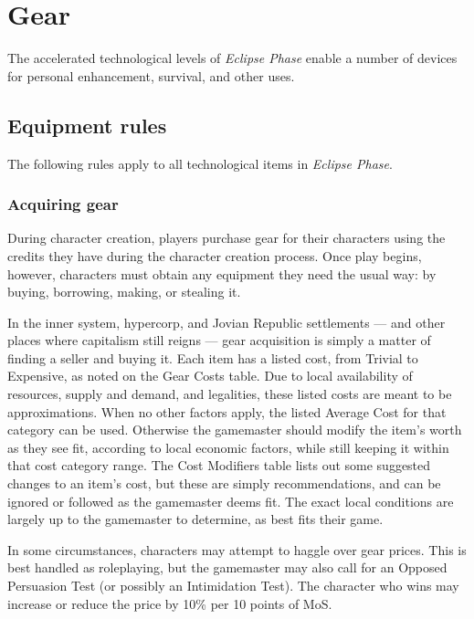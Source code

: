 



\chapter{Gear} \label{cha:gear} 

The accelerated technological levels of \emph{Eclipse Phase} enable a number of devices for personal enhancement, survival, and other uses. 



\section{Equipment rules} \label{sec:equipment-rules} 

The following rules apply to all technological items in \emph{Eclipse Phase}. 



\subsection{Acquiring gear} \label{sec:acquiring-gear} 

During character creation, players purchase gear for their characters using the credits they have during the character creation process. Once play begins, however, characters must obtain any equipment they need the usual way: by buying, borrowing, making, or stealing it. 

In the inner system, hypercorp, and Jovian Republic settlements --- and other places where capitalism still reigns --- gear acquisition is simply a matter of finding a seller and buying it. Each item has a listed cost, from Trivial to Expensive, as noted on the Gear Costs table. Due to local availability of resources, supply and demand, and legalities, these listed costs are meant to be approximations. When no other factors apply, the listed Average Cost for that category can be used. Otherwise the gamemaster should modify the item’s worth as they see fit, according to local economic factors, while still keeping it within that cost category range. The Cost Modifiers table lists out some suggested changes to an item’s cost, but these are simply recommendations, and can be ignored or followed as the gamemaster deems fit. The exact local conditions are largely up to the gamemaster to determine, as best fits their game. 

In some circumstances, characters may attempt to haggle over gear prices. This is best handled as roleplaying, but the gamemaster may also call for an Opposed Persuasion Test (or possibly an Intimidation Test). The character who wins may increase or reduce the price by 10\% per 10 points of MoS. 

